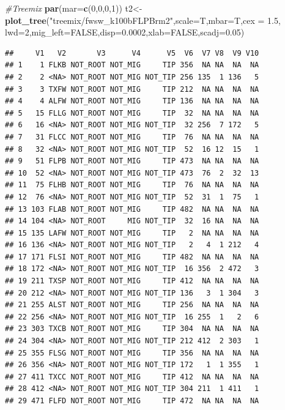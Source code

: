 \documentclass[]{article}
\newenvironment{Shaded}{\begin{snugshade}}{\end{snugshade}}
\newcommand{\KeywordTok}[1]{\textcolor[rgb]{0.13,0.29,0.53}{\textbf{#1}}}
\newcommand{\DataTypeTok}[1]{\textcolor[rgb]{0.13,0.29,0.53}{#1}}
\newcommand{\DecValTok}[1]{\textcolor[rgb]{0.00,0.00,0.81}{#1}}
\newcommand{\FloatTok}[1]{\textcolor[rgb]{0.00,0.00,0.81}{#1}}
\newcommand{\StringTok}[1]{\textcolor[rgb]{0.31,0.60,0.02}{#1}}
\newcommand{\CommentTok}[1]{\textcolor[rgb]{0.56,0.35,0.01}{\textit{#1}}}
\newcommand{\OtherTok}[1]{\textcolor[rgb]{0.56,0.35,0.01}{#1}}
\newcommand{\NormalTok}[1]{#1}
\begin{document}
\begin{Shaded}
\begin{Highlighting}[]
\CommentTok{#Treemix}
\KeywordTok{par}\NormalTok{(}\DataTypeTok{mar=}\KeywordTok{c}\NormalTok{(}\DecValTok{0}\NormalTok{,}\DecValTok{0}\NormalTok{,}\DecValTok{0}\NormalTok{,}\DecValTok{1}\NormalTok{))}
\NormalTok{t2<-}\KeywordTok{plot_tree}\NormalTok{(}\StringTok{"treemix/fwsw_k100bFLPBrm2"}\NormalTok{,}\DataTypeTok{scale=}\NormalTok{T,}\DataTypeTok{mbar=}\NormalTok{T,}\DataTypeTok{cex =} \FloatTok{1.5}\NormalTok{,}
              \DataTypeTok{lwd=}\DecValTok{2}\NormalTok{,}\DataTypeTok{mig_left=}\OtherTok{FALSE}\NormalTok{,}\DataTypeTok{disp=}\FloatTok{0.0002}\NormalTok{,}\DataTypeTok{xlab=}\OtherTok{FALSE}\NormalTok{,}\DataTypeTok{scadj=}\FloatTok{0.05}\NormalTok{)}
\end{Highlighting}
\end{Shaded}

\begin{verbatim}
##     V1   V2       V3      V4      V5  V6  V7 V8  V9 V10
## 1    1 FLKB NOT_ROOT NOT_MIG     TIP 356  NA NA  NA  NA
## 2    2 <NA> NOT_ROOT NOT_MIG NOT_TIP 256 135  1 136   5
## 3    3 TXFW NOT_ROOT NOT_MIG     TIP 212  NA NA  NA  NA
## 4    4 ALFW NOT_ROOT NOT_MIG     TIP 136  NA NA  NA  NA
## 5   15 FLLG NOT_ROOT NOT_MIG     TIP  32  NA NA  NA  NA
## 6   16 <NA> NOT_ROOT NOT_MIG NOT_TIP  32 256  7 172   5
## 7   31 FLCC NOT_ROOT NOT_MIG     TIP  76  NA NA  NA  NA
## 8   32 <NA> NOT_ROOT NOT_MIG NOT_TIP  52  16 12  15   1
## 9   51 FLPB NOT_ROOT NOT_MIG     TIP 473  NA NA  NA  NA
## 10  52 <NA> NOT_ROOT NOT_MIG NOT_TIP 473  76  2  32  13
## 11  75 FLHB NOT_ROOT NOT_MIG     TIP  76  NA NA  NA  NA
## 12  76 <NA> NOT_ROOT NOT_MIG NOT_TIP  52  31  1  75   1
## 13 103 FLAB NOT_ROOT NOT_MIG     TIP 482  NA NA  NA  NA
## 14 104 <NA> NOT_ROOT     MIG NOT_TIP  32  16 NA  NA  NA
## 15 135 LAFW NOT_ROOT NOT_MIG     TIP   2  NA NA  NA  NA
## 16 136 <NA> NOT_ROOT NOT_MIG NOT_TIP   2   4  1 212   4
## 17 171 FLSI NOT_ROOT NOT_MIG     TIP 482  NA NA  NA  NA
## 18 172 <NA> NOT_ROOT NOT_MIG NOT_TIP  16 356  2 472   3
## 19 211 TXSP NOT_ROOT NOT_MIG     TIP 412  NA NA  NA  NA
## 20 212 <NA> NOT_ROOT NOT_MIG NOT_TIP 136   3  1 304   3
## 21 255 ALST NOT_ROOT NOT_MIG     TIP 256  NA NA  NA  NA
## 22 256 <NA> NOT_ROOT NOT_MIG NOT_TIP  16 255  1   2   6
## 23 303 TXCB NOT_ROOT NOT_MIG     TIP 304  NA NA  NA  NA
## 24 304 <NA> NOT_ROOT NOT_MIG NOT_TIP 212 412  2 303   1
## 25 355 FLSG NOT_ROOT NOT_MIG     TIP 356  NA NA  NA  NA
## 26 356 <NA> NOT_ROOT NOT_MIG NOT_TIP 172   1  1 355   1
## 27 411 TXCC NOT_ROOT NOT_MIG     TIP 412  NA NA  NA  NA
## 28 412 <NA> NOT_ROOT NOT_MIG NOT_TIP 304 211  1 411   1
## 29 471 FLFD NOT_ROOT NOT_MIG     TIP 472  NA NA  NA  NA

\end{verbatim}
\end{document}
